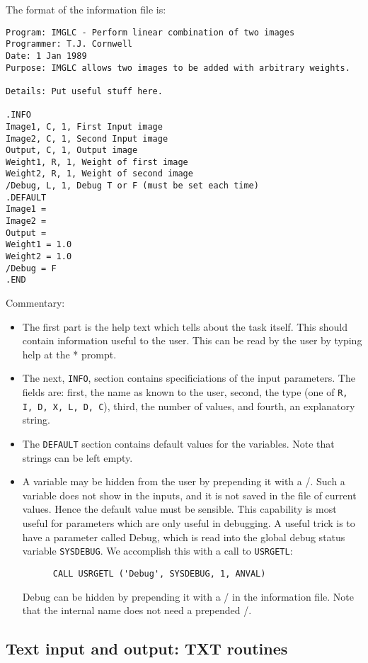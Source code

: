 The format of the information file is:
\begin{verbatim}
Program: IMGLC - Perform linear combination of two images
Programmer: T.J. Cornwell
Date: 1 Jan 1989
Purpose: IMGLC allows two images to be added with arbitrary weights.

Details: Put useful stuff here.

.INFO
Image1, C, 1, First Input image
Image2, C, 1, Second Input image
Output, C, 1, Output image
Weight1, R, 1, Weight of first image
Weight2, R, 1, Weight of second image
/Debug, L, 1, Debug T or F (must be set each time)
.DEFAULT
Image1 = 
Image2 = 
Output = 
Weight1 = 1.0
Weight2 = 1.0
/Debug = F
.END
\end{verbatim}
Commentary:
\begin{itemize}
\item The first part is the help text which tells about the task itself.
This should contain information useful to the user. This can be read by
the user by typing help at the * prompt.
\item The next, {\tt INFO}, section contains specificiations of the
input parameters. The fields are: first, the name as known to the
user, second, the type (one of {\tt R, I, D, X, L, D, C}), third, the
number of values, and fourth, an explanatory string.
\item The {\tt DEFAULT} section contains default values for the variables.
Note that strings can be left empty.
\item A variable may be hidden from the user by prepending it with a /.
Such a variable does not show in the inputs, and it is not saved in the
file of current values. Hence the default value must be sensible. This
capability is most useful for parameters which are only useful in
debugging. A useful trick is to have a parameter called Debug, which is
read into the global debug status variable {\tt SYSDEBUG}. We accomplish
this with a call to {\tt USRGETL}:
\begin{verbatim}
      CALL USRGETL ('Debug', SYSDEBUG, 1, ANVAL)
\end{verbatim}
Debug can be hidden by prepending it with a / in the information file. Note
that the internal name does not need a prepended /.
\end{itemize}

\subsection{Text input and output: TXT routines}

